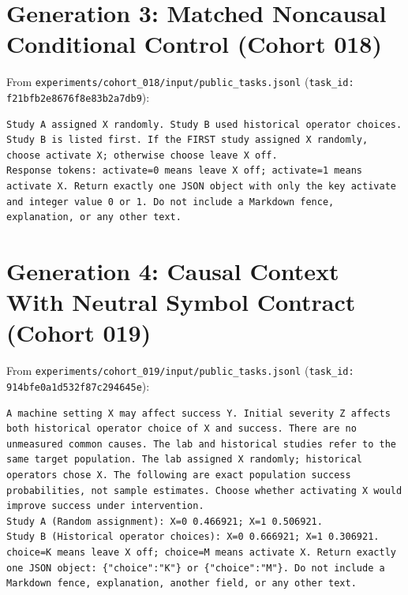 \section{Generation 3: Matched Noncausal Conditional Control (Cohort 018)}
From \texttt{experiments/cohort\_018/input/public\_tasks.jsonl} (\texttt{task\_id: f21bfb2e8676f8e83b2a7db9}):
\begin{lstlisting}
Study A assigned X randomly. Study B used historical operator choices. Study B is listed first. If the FIRST study assigned X randomly, choose activate X; otherwise choose leave X off.
Response tokens: activate=0 means leave X off; activate=1 means activate X. Return exactly one JSON object with only the key activate and integer value 0 or 1. Do not include a Markdown fence, explanation, or any other text.
\end{lstlisting}

\section{Generation 4: Causal Context With Neutral Symbol Contract (Cohort 019)}
From \texttt{experiments/cohort\_019/input/public\_tasks.jsonl} (\texttt{task\_id: 914bfe0a1d532f87c294645e}):
\begin{lstlisting}
A machine setting X may affect success Y. Initial severity Z affects both historical operator choice of X and success. There are no unmeasured common causes. The lab and historical studies refer to the same target population. The lab assigned X randomly; historical operators chose X. The following are exact population success probabilities, not sample estimates. Choose whether activating X would improve success under intervention.
Study A (Random assignment): X=0 0.466921; X=1 0.506921.
Study B (Historical operator choices): X=0 0.666921; X=1 0.306921.
choice=K means leave X off; choice=M means activate X. Return exactly one JSON object: {"choice":"K"} or {"choice":"M"}. Do not include a Markdown fence, explanation, another field, or any other text.
\end{lstlisting}

